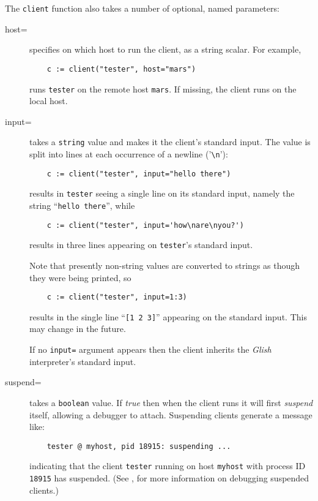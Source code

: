 The {\tt client} function also takes a number of optional, named parameters:
\begin{description}

\item[host=]
specifies on which host to run the client, as a string scalar.
For example,
\begin{verbatim}
    c := client("tester", host="mars")
\end{verbatim}
runs {\tt tester} on the remote host {\tt mars}.  If missing, the
client runs on the local host.

\item[input=]
takes a {\tt string} value and makes it the client's
standard input.  The value is split into lines at each occurrence
of a newline ('\verb+\n+'):
\begin{verbatim}
    c := client("tester", input="hello there")
\end{verbatim}
results in {\tt tester} seeing a single line on its standard input,
namely the string ``{\tt hello there}'', while
\begin{verbatim}
    c := client("tester", input='how\nare\nyou?')
\end{verbatim}
results in three lines appearing on {\tt tester}'s standard input.

Note that presently non-string values are converted to strings as
though they were being printed, so
\begin{verbatim}
    c := client("tester", input=1:3)
\end{verbatim}
results in the single line ``{\tt [1 2 3]}'' appearing on the standard
input.  This may change in the future.

If no {\tt input=} argument appears then the client inherits the
{\em Glish} interpreter's standard input.

\item[suspend=]
takes a {\tt boolean} value.  If {\em true} then when
the client runs it will first {\em suspend} itself, allowing a debugger
to attach.  Suspending clients generate a message like:
\begin{verbatim}
    tester @ myhost, pid 18915: suspending ...
\end{verbatim}
indicating that the client {\tt tester} running on host {\tt myhost} with
process ID {\tt 18915} has suspended.
(See , for more information on debugging suspended
clients.)


\end{description}
